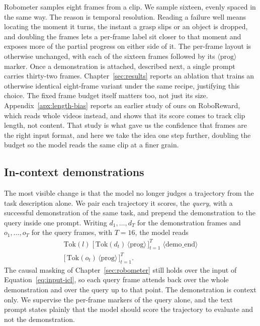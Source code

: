 Robometer samples eight frames from a clip. We sample sixteen, evenly spaced in the same way. The reason is temporal resolution. Reading a failure well means locating the moment it turns, the instant a grasp slips or an object is dropped, and doubling the frames lets a per-frame label sit closer to that moment and exposes more of the partial progress on either side of it. The per-frame layout is otherwise unchanged, with each of the sixteen frames followed by its $\langle\mathrm{prog}\rangle$ marker. Once a demonstration is attached, described next, a single prompt carries thirty-two frames. Chapter~\ref{sec:results} reports an ablation that trains an otherwise identical eight-frame variant under the same recipe, justifying this choice. The fixed frame budget itself matters too, not just its size. Appendix~\ref{apx:length-bias} reports an earlier study of ours on RoboReward, which reads whole videos instead, and shows that its score comes to track clip length, not content. That study is what gave us the confidence that frames are the right input format, and here we take the idea one step further, doubling the budget so the model reads the same clip at a finer grain.

\subsection{In-context demonstrations}
\label{sec:method-icl}

The most visible change is that the model no longer judges a trajectory from the task description alone. We pair each trajectory it scores, the \emph{query}, with a successful demonstration of the same task, and prepend the demonstration to the query inside one prompt. Writing $d_1,\dots,d_T$ for the demonstration frames and $o_1,\dots,o_T$ for the query frames, with $T=16$, the model reads
\begin{multline}
\mathrm{Tok}(l)\;\big[\,\mathrm{Tok}(d_t)\,\langle\mathrm{prog}\rangle\,\big]_{t=1}^{T}\;\langle\mathrm{demo\_end}\rangle\\
\big[\,\mathrm{Tok}(o_t)\,\langle\mathrm{prog}\rangle\,\big]_{t=1}^{T} .
\label{eq:input-icl}
\end{multline}
The causal masking of Chapter~\ref{sec:robometer} still holds over the input of Equation~\ref{eq:input-icl}, so each query frame attends back over the whole demonstration and over the query up to that point. The demonstration is context only. We supervise the per-frame markers of the query alone, and the text prompt states plainly that the model should score the trajectory to evaluate and not the demonstration.

